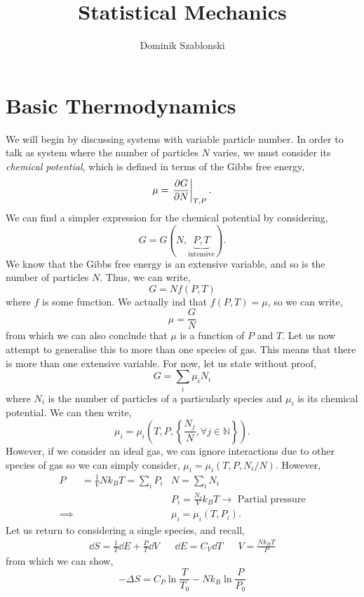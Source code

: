 \documentclass{book}
\title{Statistical Mechanics}
\author{Dominik Szablonski}
\begin{document}
\maketitle

\tableofcontents

\chapter{Basic Thermodynamics}
We will begin by discussing systems with variable particle number. In order to talk as system where the number of particles $N$ varies, we must consider its \textit{chemical potential}, which is defined in terms of the Gibbs free energy,
\begin{equation}
	\mu = \eval{\pdv{G}{N}}_{T,P}.
\end{equation} 
We can find a simpler expression for the chemical potential by considering,
\begin{equation}
	G = G(N,\underbrace{P,T}_{\text{intensive}}).
\end{equation}
We know that the Gibbs free energy is an extensive variable, and so is the number of particles $N$. Thus, we can write,
\begin{equation}
	G = Nf(P,T)
\end{equation}
where $f$ is some function. We actually ind that $f(P,T) = \mu$, so we can write,
\begin{equation}
	\mu = \frac{G}{N}
\end{equation}
from which we can also conclude that $\mu$ is a function of $P$ and $T$. Let us now attempt to generalise this to more than one species of gas. This means that there is more than one extensive variable. For now, let us state without proof,
\begin{equation}
	G = \sum_i \mu_i N_i
\end{equation}
where $N_i$ is the number of particles of a particularly species and $\mu_i$ is its chemical potential. We can then write,
\begin{equation}
	\mu_i = \mu_i\left(T, P, \left\{\frac{N_j}{N}, \forall j \in \mathbb{N}\right\}\right).
\end{equation}
However, if we consider an ideal gas, we can ignore interactions due to other species of gas so we can simply consider, $\mu_i = \mu_i(T, P, N_i/N)$. However,
\begin{align}
	P & = \frac{1}{V}Nk_BT  = \sum_i P_i  & N = \sum_i N_i \\
	& &P_i = \frac{N_i}{V}k_BT \to \text{ Partial pressure} \\
	\implies && \mu_i = \mu_i (T, P_i).
\end{align}
Let us return to considering a single species, and recall,
\begin{align}
	\dd{S} = \frac{1}{T}\dd{E} + \frac{P}{T}\dd{V} && \dd{E} = C_V\dd{T} && V = \frac{Nk_BT}{P}
\end{align}
from which we can show,
\begin{equation}
	- \Delta S = C_P\ln\frac{T}{T_0} - Nk_B\ln\frac{P}{P_0}
\end{equation}
\end{document}
